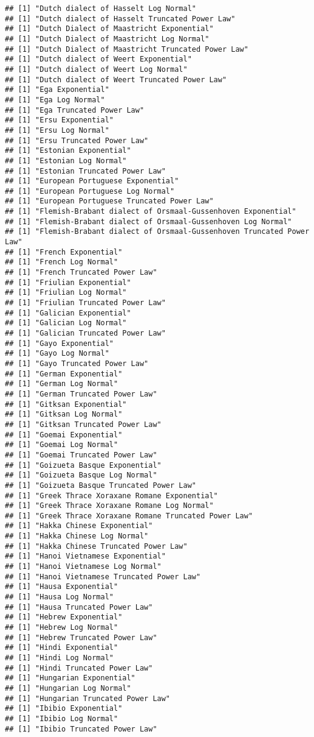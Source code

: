 \documentclass[]{article}
\begin{document}
\begin{verbatim}
## [1] "Dutch dialect of Hasselt Log Normal"
## [1] "Dutch dialect of Hasselt Truncated Power Law"
## [1] "Dutch Dialect of Maastricht Exponential"
## [1] "Dutch Dialect of Maastricht Log Normal"
## [1] "Dutch Dialect of Maastricht Truncated Power Law"
## [1] "Dutch dialect of Weert Exponential"
## [1] "Dutch dialect of Weert Log Normal"
## [1] "Dutch dialect of Weert Truncated Power Law"
## [1] "Ega Exponential"
## [1] "Ega Log Normal"
## [1] "Ega Truncated Power Law"
## [1] "Ersu Exponential"
## [1] "Ersu Log Normal"
## [1] "Ersu Truncated Power Law"
## [1] "Estonian Exponential"
## [1] "Estonian Log Normal"
## [1] "Estonian Truncated Power Law"
## [1] "European Portuguese Exponential"
## [1] "European Portuguese Log Normal"
## [1] "European Portuguese Truncated Power Law"
## [1] "Flemish-Brabant dialect of Orsmaal-Gussenhoven Exponential"
## [1] "Flemish-Brabant dialect of Orsmaal-Gussenhoven Log Normal"
## [1] "Flemish-Brabant dialect of Orsmaal-Gussenhoven Truncated Power Law"
## [1] "French Exponential"
## [1] "French Log Normal"
## [1] "French Truncated Power Law"
## [1] "Friulian Exponential"
## [1] "Friulian Log Normal"
## [1] "Friulian Truncated Power Law"
## [1] "Galician Exponential"
## [1] "Galician Log Normal"
## [1] "Galician Truncated Power Law"
## [1] "Gayo Exponential"
## [1] "Gayo Log Normal"
## [1] "Gayo Truncated Power Law"
## [1] "German Exponential"
## [1] "German Log Normal"
## [1] "German Truncated Power Law"
## [1] "Gitksan Exponential"
## [1] "Gitksan Log Normal"
## [1] "Gitksan Truncated Power Law"
## [1] "Goemai Exponential"
## [1] "Goemai Log Normal"
## [1] "Goemai Truncated Power Law"
## [1] "Goizueta Basque Exponential"
## [1] "Goizueta Basque Log Normal"
## [1] "Goizueta Basque Truncated Power Law"
## [1] "Greek Thrace Xoraxane Romane Exponential"
## [1] "Greek Thrace Xoraxane Romane Log Normal"
## [1] "Greek Thrace Xoraxane Romane Truncated Power Law"
## [1] "Hakka Chinese Exponential"
## [1] "Hakka Chinese Log Normal"
## [1] "Hakka Chinese Truncated Power Law"
## [1] "Hanoi Vietnamese Exponential"
## [1] "Hanoi Vietnamese Log Normal"
## [1] "Hanoi Vietnamese Truncated Power Law"
## [1] "Hausa Exponential"
## [1] "Hausa Log Normal"
## [1] "Hausa Truncated Power Law"
## [1] "Hebrew Exponential"
## [1] "Hebrew Log Normal"
## [1] "Hebrew Truncated Power Law"
## [1] "Hindi Exponential"
## [1] "Hindi Log Normal"
## [1] "Hindi Truncated Power Law"
## [1] "Hungarian Exponential"
## [1] "Hungarian Log Normal"
## [1] "Hungarian Truncated Power Law"
## [1] "Ibibio Exponential"
## [1] "Ibibio Log Normal"
## [1] "Ibibio Truncated Power Law"

\end{verbatim}
\end{document}
